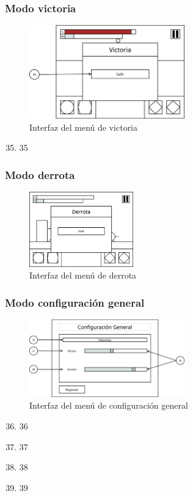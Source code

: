 \subsubsection{Modo victoria}
\begin{figure}[H]
    \centering
    \includegraphics[width=0.6\textwidth]{5-Cuerpo/Chapter5/I8.png} %
    \caption{Interfaz del menú de victoria}
    \label{fig:Interface_Victoria}
\end{figure}
\begin{enumerate}\setcounter{enumi}{34}
    \item 35
\end{enumerate}

\subsubsection{Modo derrota}
\begin{figure}[H]
    \centering
    \includegraphics[width=0.4\textwidth]{5-Cuerpo/Chapter5/I9.png} %
    \caption{Interfaz del menú de derrota}
    \label{fig:Interface_Derrota}
\end{figure}


\subsubsection{Modo configuración general}
\begin{figure}[H]
    \centering
    \includegraphics[width=0.6\textwidth]{5-Cuerpo/Chapter5/I10.png} %
    \caption{Interfaz del menú de configuración general}
    \label{fig:Interface_Configuracion_General}
\end{figure}
\begin{enumerate}\setcounter{enumi}{35}
    \item 36
    \item 37
    \item 38
    \item 39
\end{enumerate}
